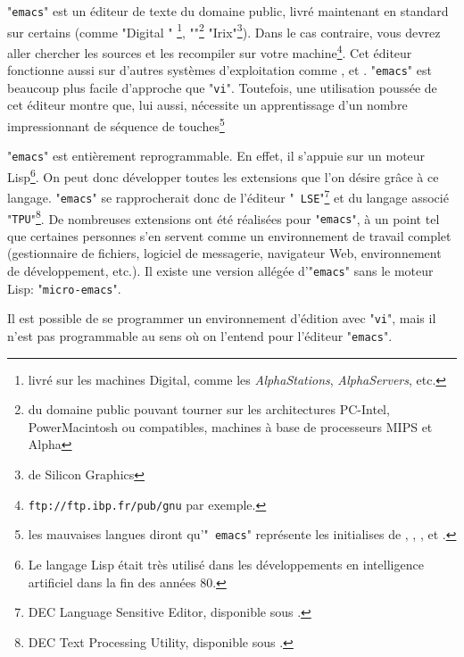 "{\tt emacs}" est un {\'e}diteur de texte du domaine public, livr{\'e}
maintenant en standard sur certains {\Unix} (comme "Digital
{\Unix}" \footnote{{\Unix} livr{\'e} sur les machines Digital, comme les
{\sl AlphaStations}, {\sl AlphaServers}, etc.},
"{\Linux}"\footnote{{\Unix} du domaine public pouvant tourner sur
les architectures PC-Intel, PowerMacintosh ou compatibles, machines {\`a}
base de processeurs MIPS et Alpha} "Irix"\footnote{{\Unix} de
Silicon Graphics}). Dans le cas contraire, vous devrez aller chercher
les sources et les recompiler sur votre machine\footnote{
{\tt ftp://ftp.ibp.fr/pub/gnu} par exemple.}. Cet {\'e}diteur fonctionne
aussi sur d'autres syst{\`e}mes d'exploitation comme {\MacOS}, {\Windows} et
{\OpenVMS}. "{\tt emacs}" est beaucoup plus facile d'approche que
"{\tt vi}". Toutefois, une utilisation pouss{\'e}e de cet {\'e}diteur montre
que, lui aussi, n{\'e}cessite un apprentissage d'un nombre impressionnant de
s{\'e}quence de touches\footnote{les mauvaises langues diront qu'"{\tt
emacs}" repr{\'e}sente les initialises de \esckey, , \altkey,
\ctrlkey et \shiftkey.}

"{\tt emacs}" est enti{\`e}rement reprogrammable. En effet, il s'appuie
sur un moteur Lisp\footnote{Le langage Lisp {\'e}tait tr{\`e}s utilis{\'e} dans les
d{\'e}veloppements en intelligence artificiel dans la fin des ann{\'e}es 80.}.
On peut donc d{\'e}velopper toutes les extensions que l'on d{\'e}sire gr{\^a}ce {\`a} ce
langage. "{\tt emacs}" se rapprocherait donc de l'{\'e}diteur "{\tt
LSE}"\footnote{DEC Language Sensitive Editor, disponible sous {\OpenVMS}.}
et du langage associ{\'e} "{\tt TPU}"\footnote{DEC Text Processing
Utility, disponible sous {\OpenVMS}.}. De nombreuses extensions ont {\'e}t{\'e}
r{\'e}alis{\'e}es pour "{\tt emacs}", {\`a} un point tel que certaines personnes
s'en servent comme un environnement de travail complet (gestionnaire de
fichiers, logiciel de messagerie, navigateur Web, environnement de
d{\'e}veloppement, etc.). Il existe une version all{\'e}g{\'e}e d'"{\tt emacs}"
sans le moteur Lisp: "{\tt micro-emacs}".

\begin{remarque}
Il est possible de se programmer un environnement d'{\'e}dition avec "{\tt vi}",
mais il n'est pas programmable au sens o{\`u} on l'entend pour l'{\'e}diteur
"{\tt emacs}".
\end{remarque}


